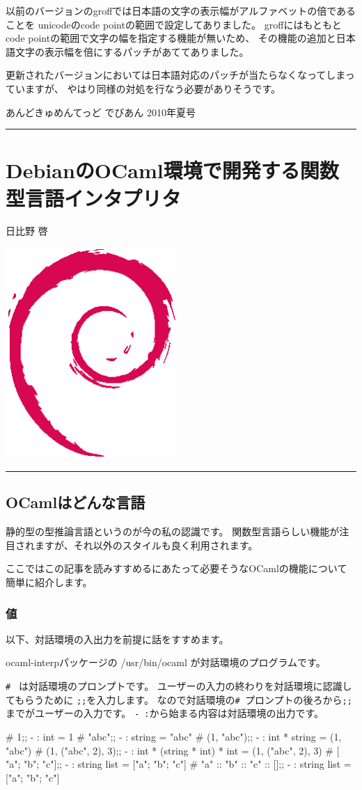 \documentclass[mingoth,a4paper]{jsarticle}
\renewcommand{\dancersection}[2]{%
\newpage
あんどきゅめんてっど でびあん 2010年夏号
%
\vspace{0.1mm}\\
{\color{dancerlightblue}\rule{\hsize}{2mm}}

%
%
\begin{minipage}[t]{0.6\hsize}
\color{dancerdarkblue}
\vspace{1cm}
\section{#1}
\hfill{}#2\\
\end{minipage}
\begin{minipage}[t]{0.4\hsize}
\vspace{-2cm}
\hfill{}\includegraphics[height=8cm]{image200502/openlogo-nd.eps}\\
\vspace{-5cm}
\end{minipage}
%
%
{\color{dancerdarkblue}\rule{0.74\hsize}{2mm}}
%
\vspace{2cm}
}
\begin{document}
以前のバージョンのgroffでは日本語の文字の表示幅がアルファベットの倍であることを
unicodeのcode pointの範囲で設定してありました。
groffにはもともとcode pointの範囲で文字の幅を指定する機能が無いため、
その機能の追加と日本語文字の表示幅を倍にするパッチがあててありました。

更新されたバージョンにおいては日本語対応のパッチが当たらなくなってしまっていますが、
やはり同様の対処を行なう必要がありそうです。


\dancersection{DebianのOCaml環境で開発する関数型言語インタプリタ}{日比野 啓}

\subsection{OCamlはどんな言語}

静的型の型推論言語というのが今の私の認識です。
関数型言語らしい機能が注目されますが、それ以外のスタイルも良く利用されます。

ここではこの記事を読みすすめるにあたって必要そうなOCamlの機能について簡単に紹介します。

\subsubsection{値}

以下、対話環境の入出力を前提に話をすすめます。

ocaml-interpパッケージの /usr/bin/ocaml が対話環境のプログラムです。

\verb|# | は対話環境のプロンプトです。
ユーザーの入力の終わりを対話環境に認識してもらうために \verb|;;|を入力します。
なので対話環境の\verb|# |プロンプトの後ろから\verb|;;|までがユーザーの入力です。
\verb|- :|から始まる内容は対話環境の出力です。

\begin{commandline}
# 1;;
- : int = 1
# "abc";;
- : string = "abc"
# (1, "abc");;
- : int * string = (1, "abc")
# (1, ("abc", 2), 3);;
- : int * (string * int) * int = (1, ("abc", 2), 3)
# [ "a"; "b"; "c"];;
- : string list = ["a"; "b"; "c"]
# "a" :: "b" :: "c" :: [];;
- : string list = ["a"; "b"; "c"]
\end{commandline}
\end{document}
